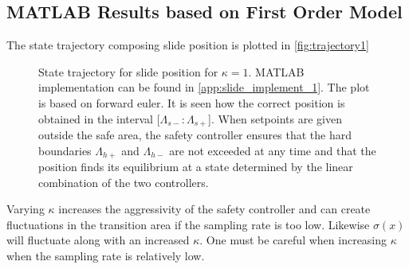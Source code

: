 \subsection{MATLAB Results based on First Order Model}\label{subsec:matlab-results-1order}
The state trajectory composing slide position is plotted in \autoref{fig:trajectory1}
%
\begin{figure}[H]
%
%
\caption{State trajectory for slide position for $\kappa=1$. MATLAB implementation can be found in \autoref{app:slide_implement_1}. The plot is based on forward euler. It is seen how the correct position is obtained in the interval $[\Lambda_{s-}:\Lambda_{s+}$]. When setpoints are given outside the safe area, the safety controller ensures that the hard boundaries $\Lambda_{h+}$ and $\Lambda_{h-}$ are not exceeded at any time and that the position finds its equilibrium at a state determined by the linear combination of the two controllers.}
\label{fig:trajectory1}
\end{figure}
%
%
Varying $\kappa$ increases the aggressivity of the safety controller and can create fluctuations in the transition area if the sampling rate is too low. Likewise $\sigma(x)$ will fluctuate along with an increased $\kappa$. One must be careful when increasing $\kappa$ when the sampling rate is relatively low. %

